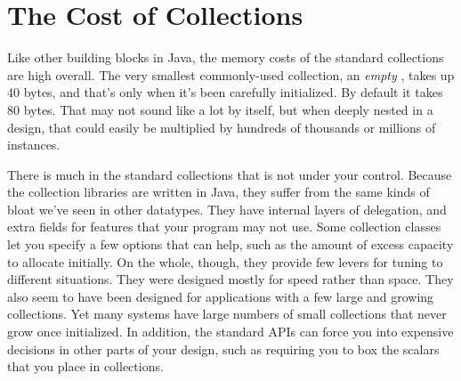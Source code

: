 \begin{description}

\end{description}


\section{The Cost of Collections}
\label{sec:designing-with-collections}

Like other building blocks in Java, the memory costs of the standard collections
are high overall. The very smallest commonly-used collection, an
\emph{empty} , takes up 40 bytes, and that's only when it's been carefully
initialized. By default it takes 80 bytes. That may not sound like a lot by
itself, but when deeply nested in a design, that could easily be multiplied
by hundreds of thousands or millions of instances.  

There is much in the standard collections that is not under your control.
Because the collection libraries are written in Java, they suffer
from the same kinds of bloat we've seen in other datatypes. They have
internal layers of delegation, and extra fields for features that your program
may not use. Some
collection classes let you specify a few options that can help, such as
the amount of excess capacity to allocate initially. On the
whole, though, they provide few levers for tuning to different situations. They
were designed mostly for speed rather than space. They also seem to have been
designed for applications with a few large and growing collections. Yet many systems have large numbers
of small collections that never grow once initialized. In addition, the standard APIs can force you into expensive
decisions in other parts of your design, such as requiring you to box the
scalars that you place in collections.


